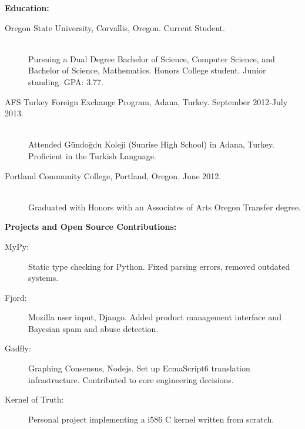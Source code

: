 \documentclass[11pt]{article}
\begin{document}
\bigskip

{\Large \bf Education:}
\begin{description}
	\item[Oregon State University, Corvallis, Oregon.
		\hfill Current Student.]
		\hfill \\
		Pursuing a Dual Degree Bachelor of Science, Computer Science,
		and Bachelor of Science, Mathematics.
		Honors College student. Junior standing. GPA: 3.77.
		
	\item[AFS Turkey Foreign Exchange Program, Adana, Turkey.
		\hfill September 2012-July 2013.]
		\hfill \\
		Attended G{\" u}ndo{\u g}du Koleji (Sunrise High School) in Adana, 
		Turkey. Proficient in the Turkish Language.

	\item[Portland Community College, Portland, Oregon.
		\hfill June 2012.]
		\hfill \\
		Graduated with Honors with an Associates of Arts 
		Oregon Transfer degree.

\end{description}

\bigskip

{\Large \bf Projects and Open Source Contributions:}
\begin{description}
\item[MyPy:] Static type checking for Python. Fixed parsing errors,
	removed outdated systems.
\item[Fjord:] Mozilla user input, Django. Added product management interface
	and Bayesian spam and abuse detection.
\item[Gadfly:] Graphing Consensus, Nodejs. Set up EcmaScript6 translation
	infrastructure. Contributed to core engineering decisions.
\item[Kernel of Truth:] Personal project implementing a i586 C kernel written
	from scratch.
\end{description}
\end{document}
